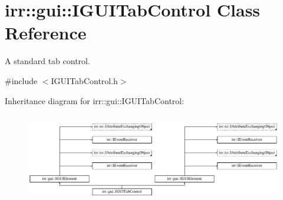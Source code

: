 \hypertarget{classirr_1_1gui_1_1IGUITabControl}{}\section{irr\+:\+:gui\+:\+:I\+G\+U\+I\+Tab\+Control Class Reference}
\label{classirr_1_1gui_1_1IGUITabControl}


A standard tab control.  




{\ttfamily \#include $<$I\+G\+U\+I\+Tab\+Control.\+h$>$}

Inheritance diagram for irr\+:\+:gui\+:\+:I\+G\+U\+I\+Tab\+Control\+:\begin{figure}[H]
\begin{center}
\leavevmode
\includegraphics[height=4.038462cm]{classirr_1_1gui_1_1IGUITabControl}
\end{center}
\end{figure}
